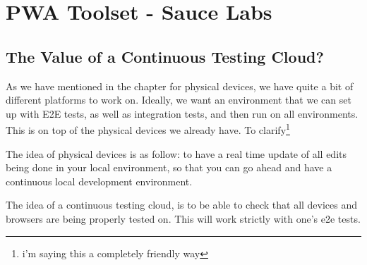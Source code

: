 \maketitle{}
\section{ PWA Toolset - Sauce Labs }

\subsection{ The Value of a Continuous Testing Cloud? }

As we have mentioned in the chapter for physical devices, we have quite a bit of
different platforms to work on. Ideally, we want an environment that we can set
up with E2E tests, as well as integration tests, and then run on all environments.
This is on top of the physical devices we already have. To clarify\footnote{i'm saying this a completely friendly way}

The idea of physical devices is as follow: to have a real time update of all
edits being done in your local environment, so that you can go ahead and have a
continuous local development environment.

The idea of a continuous testing cloud, is to be able to check that all devices
and browsers are being properly tested on. This will work strictly with one's
e2e tests.
